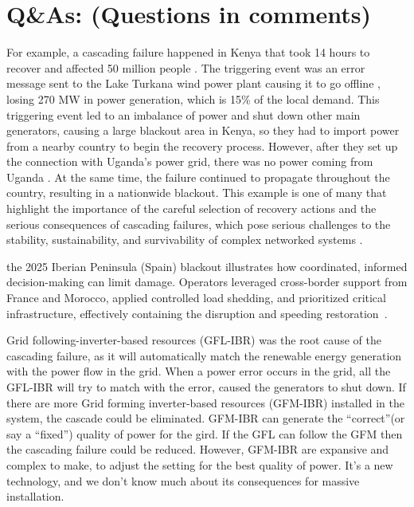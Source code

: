 \documentclass[runningheads]{llncs}
\begin{document}
\section{Q\&As: (Questions in comments) }
For example, a cascading failure happened in Kenya \cite{apkenya_dec23} that took 14 hours to recover and affected 50 million people \cite{apkenya_dec23}. The triggering event was an error message sent to the Lake Turkana wind power plant causing it to go offline \cite{apkenya_dec23}, losing 270 MW in power generation, which is 15\% of the local demand. This triggering event led to an imbalance of power and shut down other main generators, causing a large blackout area in Kenya, so they had to import power from a nearby country to begin the recovery process. However, after they set up the connection with Uganda's power grid, there was no power coming from Uganda \cite{apkenya_aug23}. At the same time, the failure continued to propagate throughout the country, resulting in a nationwide blackout. This example is one of many that highlight the importance of the careful selection of recovery actions and the serious consequences of cascading failures, which pose serious challenges to the stability, sustainability, and survivability of complex networked systems \cite{xiaohui_review_2016}. 

the 2025 Iberian Peninsula (Spain) blackout illustrates how coordinated, informed decision-making can limit damage. Operators leveraged cross-border support from France and Morocco, applied controlled load shedding, and prioritized critical infrastructure, effectively containing the disruption and speeding restoration~\cite{cetinkaya_technical_2025}.

Grid following-inverter-based resources (GFL-IBR) was the root cause of the cascading failure, as it will automatically match the renewable energy generation with the power flow in the grid. When a power error occurs in the grid, all the GFL-IBR will try to match with the error, caused the generators to shut down.
If there are more Grid forming inverter-based resources (GFM-IBR) installed in the system, the cascade could be eliminated. GFM-IBR can generate the “correct”(or say a “fixed”) quality of power for the gird. If the GFL can follow the GFM then the cascading failure could be reduced.
However, GFM-IBR are expansive and complex to make, to adjust the setting for the best quality of power. It’s a new technology, and we don’t know much about its consequences for massive installation.
\end{document}

